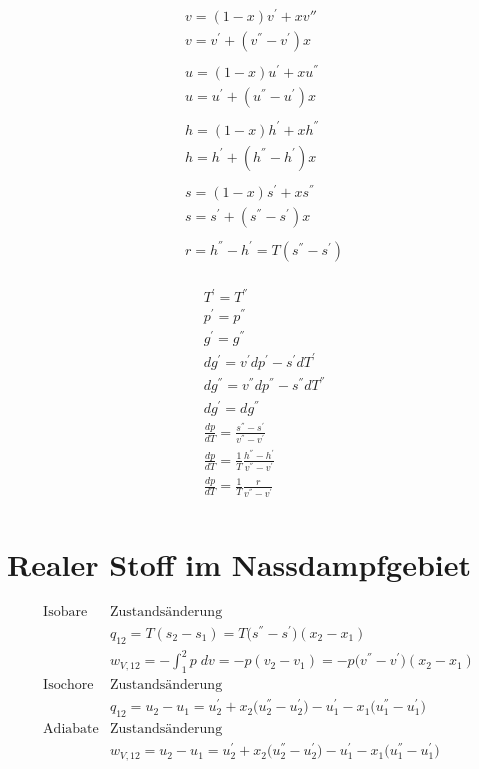 \documentclass[twocolumn]{article}
\begin{document}
\begin{multicols}{2}

\begin{align*}
	& v = (1-x)v^{'} + xv{''} \\
	& v = v^{'} + (v^{''}-v^{'})x \\ \\
	& u = (1-x) u^{'} + xu^{''} \\
	& u = u^{'} + (u^{''}-u^{'})x \\ \\
	& h = (1-x) h^{'} + xh^{''} \\
	& h = h^{'} + (h^{''}-h^{'})x \\ \\
	& s = (1-x) s^{'} + xs^{''} \\
	& s = s^{'} + (s^{''}-s^{'})x \\ \\
	& r = h^{''} - h^{'} = T(s^{''}-s^{'}) \\
\end{align*}

\begin{align*}
	& T^{'} = T^{''} \\
	& p^{'} = p^{''} \\
	& g^{'} = g^{''} \\
	&dg^{'} = v^{'}dp^{'} - s^{'}dT^{'} \\
	&dg^{''} = v^{''} dp^{''} - s^{''} dT^{''} \\
	&dg^{'} = dg^{''} \\
	& \frac{dp}{dT} = \frac{s^{''} - s^{'}}{v^{''} - v^{'}} \\
	& \frac{dp}{dT} = \frac{1}{T}\frac{h^{''} - h^{'}}{v^{''} - v^{'}} \\
	& \frac{dp}{dT} = \frac{1}{T}\frac{r}{v^{''} -v^{'}} \\
\end{align*}
\end{multicols}

\section{Realer Stoff im Nassdampfgebiet}
\begin{align*}
	\text{Isobare} &\text{Zustandsänderung} \\
	&q_{12} = T(s_2 - s_1) = T\Big(s^{''} - s^{'}\Big)(x_2-x_1) \\
	&w_{V,12} = - \int_{1}^{2} p\; dv = -p(v_2-v_1) = -p\Big(v^{''} -v^{'}\Big)(x_2-x_1) \\
	\text{Isochore} &\text{Zustandsänderung} \\
	&q_{12} = u_2 - u_1 = u_2^{'} + x_2\Big(u_2^{''} - u_2^{'} \Big) - u_1^{'} - x_1\Big(u_1^{''} - u_1^{'}\Big) \\
	\text{Adiabate} &\text{Zustandsänderung} \\
	& w_{V,12} = u_2 - u_1 = u_2^{'} + x_2 \Big( u_2^{''} - u_2^{'} \Big) - u_1^{'} - x_1\Big(u_1^{''} - u_1^{'}\Big) \\
\end{align*}
\end{document}
